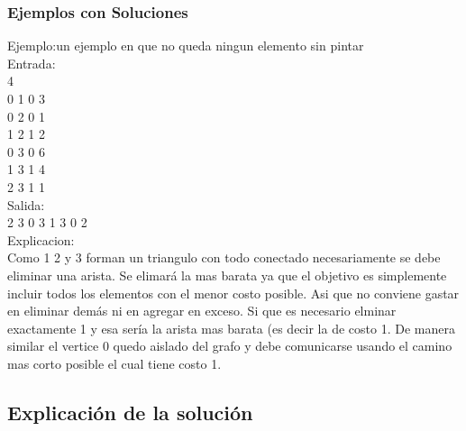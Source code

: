 \subsubsection{Ejemplos con Soluciones}
Ejemplo:un ejemplo en que no queda ningun elemento sin pintar\\
Entrada:\\
4\\
0 1 0 3\\
0 2 0 1\\
1 2 1 2\\
0 3 0 6\\
1 3 1 4\\
2 3 1 1\\
Salida:\\
2 3 0 3 1 3 0 2\\
Explicacion:\\
Como 1 2 y 3 forman un triangulo con todo conectado necesariamente se debe eliminar una arista. Se elimará la mas barata ya que el objetivo es simplemente incluir todos los elementos con el menor costo posible. Asi que no conviene gastar en eliminar demás ni en agregar en exceso. Si que es necesario elminar exactamente 1 y esa sería la arista mas barata (es decir la de costo 1. De manera similar el vertice 0 quedo aislado del grafo y debe comunicarse usando el camino mas corto posible el cual tiene costo 1.




\subsection{Explicación de la solución}

